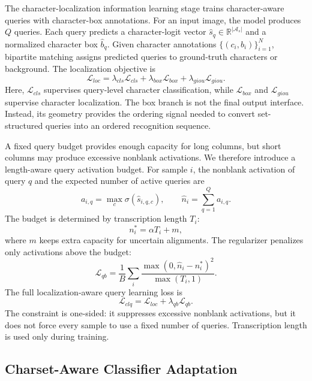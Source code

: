 The character-localization information learning stage trains character-aware queries with character-box annotations. For an input image, the model produces $Q$ queries. Each query predicts a character-logit vector $\hat{s}_q\in\mathbb{R}^{|\mathcal{A}_s|}$ and a normalized character box $\hat{b}_q$. Given character annotations $\{(c_i,b_i)\}_{i=1}^{N}$, bipartite matching assigns predicted queries to ground-truth characters or background. The localization objective is
\begin{equation}
\mathcal{L}_{loc} =
\lambda_{cls}\mathcal{L}_{cls}+
\lambda_{box}\mathcal{L}_{box}+
\lambda_{giou}\mathcal{L}_{giou}.
\end{equation}
Here, $\mathcal{L}_{cls}$ supervises query-level character classification, while $\mathcal{L}_{box}$ and $\mathcal{L}_{giou}$ supervise character localization. The box branch is not the final output interface. Instead, its geometry provides the ordering signal needed to convert set-structured queries into an ordered recognition sequence.

A fixed query budget provides enough capacity for long columns, but short columns may produce excessive nonblank activations. We therefore introduce a length-aware query activation budget. For sample $i$, the nonblank activation of query $q$ and the expected number of active queries are
\begin{equation}
a_{i,q}=\max_c\sigma(\hat{s}_{i,q,c}),\qquad
\hat{n}_i=\sum_{q=1}^{Q}a_{i,q}.
\end{equation}
The budget is determined by transcription length $T_i$:
\begin{equation}
n_i^*=\alpha T_i+m,
\end{equation}
where $m$ keeps extra capacity for uncertain alignments. The regularizer penalizes only activations above the budget:
\begin{equation}
\mathcal{L}_{qb}=\frac{1}{B}\sum_i
\frac{\max(0,\hat{n}_i-n_i^*)^2}{\max(T_i,1)}.
\end{equation}
The full localization-aware query learning loss is
\begin{equation}
\mathcal{L}_{clq}=\mathcal{L}_{loc}+\lambda_{qb}\mathcal{L}_{qb}.
\end{equation}
The constraint is one-sided: it suppresses excessive nonblank activations, but it does not force every sample to use a fixed number of queries. Transcription length is used only during training.

\subsection{Charset-Aware Classifier Adaptation}

